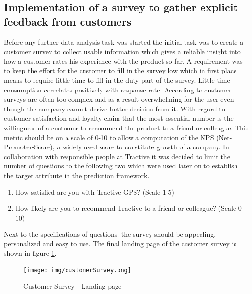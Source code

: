 \subsection{Implementation of a survey to gather explicit feedback from customers}
Before any further data analysis task was started the initial task was to create a customer survey to collect usable information which gives a reliable insight into how a customer rates his experience with the product so far. A requirement was to keep the effort for the customer to fill in the survey low which in first place means to require little time to fill in the duty part of the survey. Little time consumption correlates positively with response rate. According to \cite{reichheld2003one} customer surveys are often too complex and as a result overwhelming for the user even though the company cannot derive better decision from it. With regard to customer satisfaction and loyalty \cite{reichheld2003one} claim that the most essential number is the willingness of a customer to recommend the product to a friend or colleague. This metric should be on a scale of 0-10 to allow a computation of the NPS (Net-Promoter-Score), a widely used score to constitute growth of a company. In collaboration with responsible people at Tractive it was decided to limit the number of questions to the following two which were used later on to establish the target attribute in the prediction framework.

\begin{enumerate}
	\item How satisfied are you with Tractive GPS? (Scale 1-5)
	\item How likely are you to recommend Tractive to a friend or colleague? (Scale 0-10)
\end{enumerate}

Next to the specifications of questions, the survey should be appealing, personalized and easy to use. The final landing page of the customer survey is shown in figure \ref{fig:customerSurvey}. 

\begin{figure}
	\centering
	\texttt{[image: img/customerSurvey.png]}
	\caption{Customer Survey - Landing page}
	\label{fig:customerSurvey}
\end{figure} 


